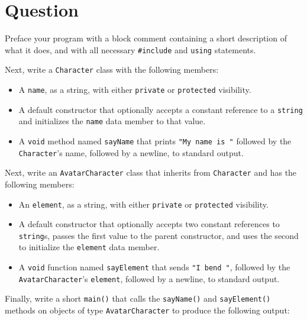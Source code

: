\newpage

\section{Question}

Preface your program with a block comment containing a short description of
what it does, and with all necessary \texttt{#include} and
\texttt{using} statements.

Next, write a \texttt{Character} class with the following members:
\begin{itemize}
  \item A \texttt{name}, as a string, with either
    \texttt{private} or \texttt{protected} visibility.
  \item A default constructor that optionally accepts a constant reference to a
    \texttt{string} and initializes the \texttt{name} data
    member to that value.
  \item A \texttt{void} method named \texttt{sayName} that
    prints \texttt{"My name is "} followed by the
    \texttt{Character}'s name, followed by a newline, to standard
    output.
\end{itemize}

Next, write an \texttt{AvatarCharacter} class that inherits from
\texttt{Character} and has the following members:
\begin{itemize}
  \item An \texttt{element}, as a string, with either
    \texttt{private} or \texttt{protected} visibility.
  \item A default constructor that optionally accepts two constant references
    to \texttt{string}s, passes the first value to the parent
    constructor, and uses the second to initialize the
    \texttt{element} data member.
  \item A \texttt{void} function named \texttt{sayElement}
    that sends \texttt{"I bend "}, followed by the
    \texttt{AvatarCharacter}'s \texttt{element}, followed by
    a newline, to standard output.
\end{itemize}

Finally, write a short \texttt{main()} that calls the
\texttt{sayName()} and \texttt{sayElement()} methods on
objects of type \texttt{AvatarCharacter} to produce the following
output:
\inputminted[label=Output]{text}{\docCodeDir/.main.gen.output}

